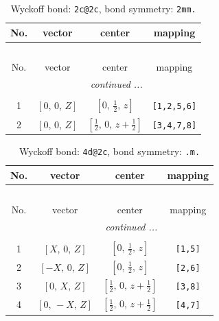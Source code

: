 \documentclass[fleqn,8pt]{jsarticle}
\begin{document}
\begin{longtable}{cccc}
\caption{Wyckoff bond: {\tt 2c@2c}, bond symmetry: {\tt 2mm.}}
 \\
 \hline \hline
No. & vector & center & mapping \\ \hline \endfirsthead

\multicolumn{3}{l}{\tablename\ \thetable{}} \\
 \hline \hline
No. & vector & center & mapping \\ \hline \endhead

 \hline \hline
\multicolumn{3}{r}{\footnotesize\it continued ...} \\ \endfoot

 \hline \hline
\multicolumn{3}{r}{} \\ \endlastfoot

1 & $\left[ 0,\, 0,\, Z \right]$ & $\left[ 0,\, \frac{1}{2},\, z \right]$ & {\tt [1,2,5,6]} \\ \hline
2 & $\left[ 0,\, 0,\, Z \right]$ & $\left[ \frac{1}{2},\, 0,\, z + \frac{1}{2} \right]$ & {\tt [3,4,7,8]} \\
\end{longtable}
\renewcommand{\arraystretch}{1.2}
\begin{longtable}{cccc}
\caption{Wyckoff bond: {\tt 4d@2c}, bond symmetry: {\tt .m.}}
 \\
 \hline \hline
No. & vector & center & mapping \\ \hline \endfirsthead

\multicolumn{3}{l}{\tablename\ \thetable{}} \\
 \hline \hline
No. & vector & center & mapping \\ \hline \endhead

 \hline \hline
\multicolumn{3}{r}{\footnotesize\it continued ...} \\ \endfoot

 \hline \hline
\multicolumn{3}{r}{} \\ \endlastfoot

1 & $\left[ X,\, 0,\, Z \right]$ & $\left[ 0,\, \frac{1}{2},\, z \right]$ & {\tt [1,5]} \\ \hline
2 & $\left[ - X,\, 0,\, Z \right]$ & $\left[ 0,\, \frac{1}{2},\, z \right]$ & {\tt [2,6]} \\ \hline
3 & $\left[ 0,\, X,\, Z \right]$ & $\left[ \frac{1}{2},\, 0,\, z + \frac{1}{2} \right]$ & {\tt [3,8]} \\ \hline
4 & $\left[ 0,\, - X,\, Z \right]$ & $\left[ \frac{1}{2},\, 0,\, z + \frac{1}{2} \right]$ & {\tt [4,7]} \\
\end{longtable}
\end{document}
